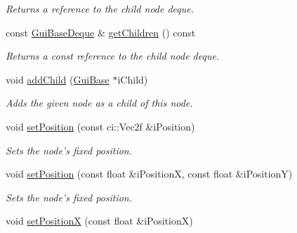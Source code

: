 \begin{DoxyCompactItemize}
\begin{DoxyCompactList}\small\item\em Returns a reference to the child node deque. \end{DoxyCompactList}\item 
\hypertarget{class_gui_base_a2ed7f1bcbc74e60224d563b26231c7ed}{const \hyperlink{class_gui_base_a0f3e57c1a942210072030196844b22eb}{Gui\-Base\-Deque} \& \hyperlink{class_gui_base_a2ed7f1bcbc74e60224d563b26231c7ed}{get\-Children} () const }\label{class_gui_base_a2ed7f1bcbc74e60224d563b26231c7ed}

\begin{DoxyCompactList}\small\item\em Returns a const reference to the child node deque. \end{DoxyCompactList}\item 
\hypertarget{class_gui_base_af9a34d3430994bf192ac23848c98dac4}{void \hyperlink{class_gui_base_af9a34d3430994bf192ac23848c98dac4}{add\-Child} (\hyperlink{class_gui_base}{Gui\-Base} $\ast$i\-Child)}\label{class_gui_base_af9a34d3430994bf192ac23848c98dac4}

\begin{DoxyCompactList}\small\item\em Adds the given node as a child of this node. \end{DoxyCompactList}\item 
\hypertarget{class_gui_base_a84219d452d3239cd82d8032bbe04ef72}{void \hyperlink{class_gui_base_a84219d452d3239cd82d8032bbe04ef72}{set\-Position} (const ci\-::\-Vec2f \&i\-Position)}\label{class_gui_base_a84219d452d3239cd82d8032bbe04ef72}

\begin{DoxyCompactList}\small\item\em Sets the node's fixed position. \end{DoxyCompactList}\item 
\hypertarget{class_gui_base_a1426d946b2d63f4c0b66e49daabf8b40}{void \hyperlink{class_gui_base_a1426d946b2d63f4c0b66e49daabf8b40}{set\-Position} (const float \&i\-Position\-X, const float \&i\-Position\-Y)}\label{class_gui_base_a1426d946b2d63f4c0b66e49daabf8b40}

\begin{DoxyCompactList}\small\item\em Sets the node's fixed position. \end{DoxyCompactList}\item 
\hypertarget{class_gui_base_a48e9f988d580de29790cc92032c1bdfd}{void \hyperlink{class_gui_base_a48e9f988d580de29790cc92032c1bdfd}{set\-Position\-X} (const float \&i\-Position\-X)}\label{class_gui_base_a48e9f988d580de29790cc92032c1bdfd}


\end{DoxyCompactItemize}
